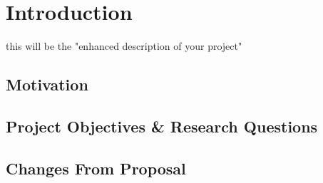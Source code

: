 \chapter{Introduction}
this will be the "enhanced description of your project"

\section{Motivation}

\section{Project Objectives \& Research Questions}

\section{Changes From Proposal}